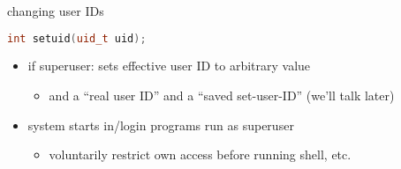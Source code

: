 
\begin{frame}[fragile,label=setuid]{changing user IDs}
\begin{lstlisting}[language=C++,style=small]
int setuid(uid_t uid);
\end{lstlisting}
\begin{itemize}
    \item if superuser: sets effective user ID to arbitrary value
        \begin{itemize}
        \item and a ``real user ID'' and a ``saved set-user-ID'' (we'll talk later)
        \end{itemize}
    \vspace{.5cm}
    \item system starts in/login programs run as superuser
        \begin{itemize}
        \item voluntarily restrict own access before running shell, etc.
        \end{itemize}
\end{itemize}
\end{frame}

